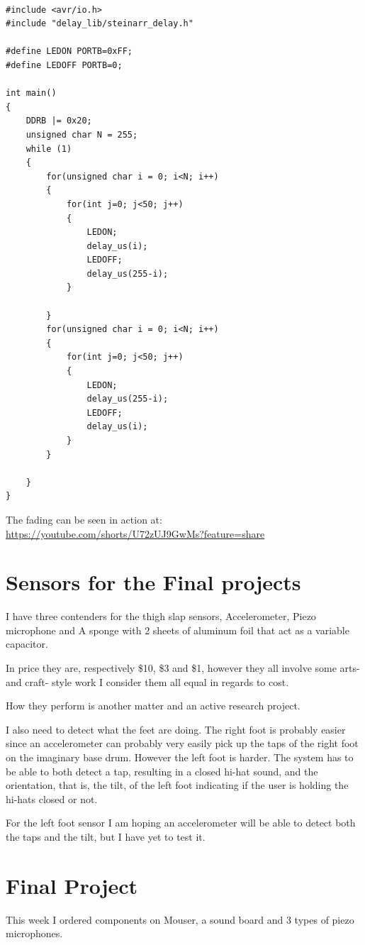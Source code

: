 \documentclass{article}
\begin{document}
\begin{lstlisting}

#include <avr/io.h>
#include "delay_lib/steinarr_delay.h"

#define LEDON PORTB=0xFF;
#define LEDOFF PORTB=0;

int main()
{
	DDRB |= 0x20;
	unsigned char N = 255;
	while (1)
	{
		for(unsigned char i = 0; i<N; i++)
		{
			for(int j=0; j<50; j++)
			{
				LEDON;
				delay_us(i);
				LEDOFF;
				delay_us(255-i);
			}

		}
		for(unsigned char i = 0; i<N; i++)
		{
			for(int j=0; j<50; j++)
			{
				LEDON;
				delay_us(255-i);
				LEDOFF;
				delay_us(i);
			}
		}

	}
}
\end{lstlisting}

The fading can be seen in action at: \url{https://youtube.com/shorts/U72zUJ9GwMs?feature=share}

\section{Sensors for the Final projects}
I have three contenders for the thigh slap sensors, Accelerometer, Piezo microphone and A sponge with 2 sheets of aluminum foil that act as a variable capacitor.

In price they are, respectively \$10, \$3 and \$1, however they all involve some arts- and craft- style work I consider them all equal in regards to cost.

How they perform is another matter and an active research project.

I also need to detect what the feet are doing. The right foot is probably easier since an accelerometer can probably very easily pick up the taps of the right foot on the imaginary base drum. However the left foot is harder. The system has to be able to both detect a tap, resulting in a closed hi-hat sound, and the orientation, that is, the tilt, of the left foot indicating if the user is holding the hi-hats closed or not.

For the left foot sensor I am hoping an accelerometer will be able to detect both the taps and the tilt, but I have yet to test it.


\section*{Final Project}
This week I ordered components on Mouser, a sound board and 3 types of piezo microphones. 
\end{document}
